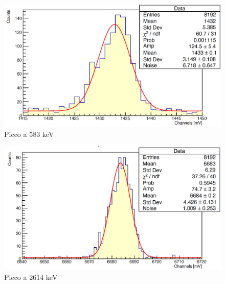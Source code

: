 \documentclass[a4paper,10pt]{article}
\begin{document}
\begin{figure}[H]
    \centering
    \includegraphics[scale=0.45]{appendice/spettri/ThPb2_108}
    \caption{Picco a 583 keV}
\end{figure}
\begin{figure}[H]
    \centering
    \includegraphics[scale=0.45]{appendice/spettri/ThPb3_108}
    \caption{Picco a 2614 keV}
\end{figure}
\end{document}
